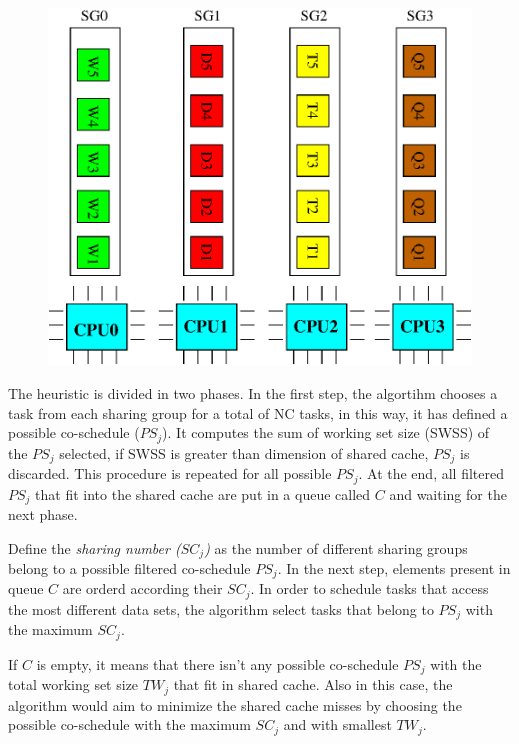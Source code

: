 \begin{description}
\begin{figure}[htbp]
\centering
\includegraphics[width=\widefigure]{images/possible_cosched.eps}
\caption{}
\label{fig:possible_cosched}
\end{figure}

The heuristic is divided in two phases. In the first step, the algortihm chooses a task from each sharing group for a total of NC tasks, in this way, it
has defined a possible co-schedule ($PS_j$). It computes the sum of working set size (SWSS) of the $PS_j$ selected, if SWSS is greater than dimension of 
shared cache, $PS_j$ is discarded. This procedure is repeated for all possible $PS_j$. At the end, all filtered $PS_j$ that fit into the shared cache are 
put in a queue called $C$ and waiting for the next phase.

Define the \textit{sharing number ($SC_j$)} as the number of different sharing groups belong to a possible filtered co-schedule $PS_j$. In the 
next step, elements present in queue $C$ are orderd according their $SC_j$. In order to schedule tasks that access the most different data sets, the 
algorithm select tasks that belong to $PS_j$ with the maximum $SC_j$.

If $C$ is empty, it means that there isn't any possible co-schedule $PS_j$ with the total working set size $TW_j$ that fit in shared cache. Also in this 
case, the algorithm would aim to minimize the shared cache misses by choosing the possible co-schedule with the maximum $SC_j$ and with smallest $TW_j$.


\end{description}

